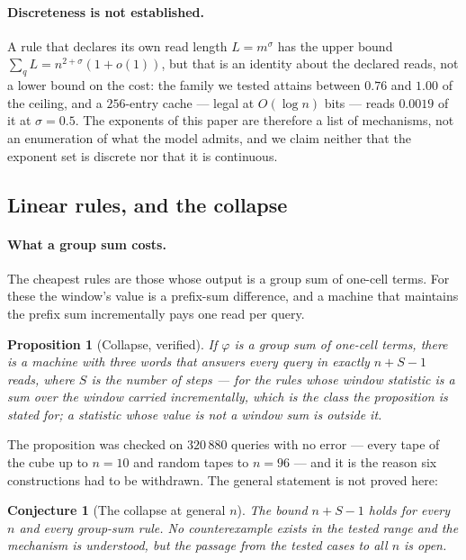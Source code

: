 \documentclass[11pt]{article}
\newtheorem{proposition}{Proposition}
\newtheorem{conjecture}{Conjecture}
\theoremstyle{remark}
\begin{document}
\paragraph{Discreteness is not established.} A rule that declares its own read length $L=m^{\sigma}$
has the upper bound $\sum_{q}L=n^{2+\sigma}(1+o(1))$, but that is an identity about the declared
reads, not a lower bound on the cost: the family we tested attains between $0.76$ and $1.00$ of the
ceiling, and a $256$-entry cache --- legal at $O(\log n)$ bits --- reads $0.0019$ of it at
$\sigma=0.5$. The exponents of this paper are therefore a list of mechanisms, not an enumeration of
what the model admits, and we claim neither that the exponent set is discrete nor that it is
continuous.


\subsection{Linear rules, and the collapse}\label{sec:linear}

\paragraph{What a group sum costs.} The cheapest rules are those whose output is a group sum of
one-cell terms. For these the window's value is a prefix-sum difference, and a machine that
maintains the prefix sum incrementally pays one read per query.

\begin{proposition}[Collapse, verified]\label{prop:collapse}
If $\varphi$ is a group sum of one-cell terms, there is a machine with three words that answers every
query in exactly $n+S-1$ reads, where $S$ is the number of steps --- for the rules whose window
statistic is a sum over the window carried incrementally, which is the class the proposition is
stated for; a statistic whose value is not a window sum is outside it.
\end{proposition}

The proposition was checked on $320\,880$ queries with no error --- every tape of the cube up to
$n=10$ and random tapes to $n=96$ --- and it is the reason six constructions had to be withdrawn.
The general statement is not proved here:

\begin{conjecture}[The collapse at general $n$]\label{conj:collapse}
The bound $n+S-1$ holds for every $n$ and every group-sum rule. No counterexample exists in the
tested range and the mechanism is understood, but the passage from the tested cases to all $n$ is
open.
\end{conjecture}
\end{document}

